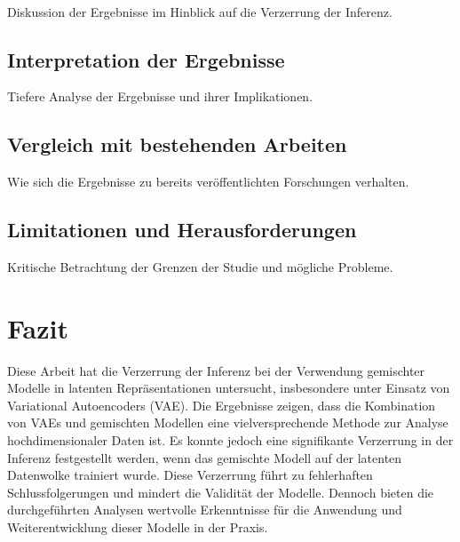 \documentclass[%
thesis=student,%
coverpage=false,%
titlepage=false,%
headmarks=true, %
german,%
font=libertine, %
math=newpxtx, %
BCOR=5mm,%
coverBCOR=11mm%
]{tumbook}
\theoremstyle{break}
\begin{document}
\\
Diskussion der Ergebnisse im Hinblick auf die Verzerrung der Inferenz.

\section{Interpretation der Ergebnisse}
Tiefere Analyse der Ergebnisse und ihrer Implikationen.
\section{Vergleich mit bestehenden Arbeiten}
Wie sich die Ergebnisse zu bereits veröffentlichten Forschungen verhalten.
\section{Limitationen und Herausforderungen}
Kritische Betrachtung der Grenzen der Studie und mögliche Probleme.
\chapter{Fazit}
Diese Arbeit hat die Verzerrung der Inferenz bei der Verwendung gemischter Modelle in latenten Repräsentationen untersucht, insbesondere unter Einsatz von Variational Autoencoders (VAE). Die Ergebnisse zeigen, dass die Kombination von VAEs und gemischten Modellen eine vielversprechende Methode zur Analyse hochdimensionaler Daten ist. Es konnte jedoch eine signifikante Verzerrung in der Inferenz festgestellt werden, wenn das gemischte Modell auf der latenten Datenwolke trainiert wurde. Diese Verzerrung führt zu fehlerhaften Schlussfolgerungen und mindert die Validität der Modelle. Dennoch bieten die durchgeführten Analysen wertvolle Erkenntnisse für die Anwendung und Weiterentwicklung dieser Modelle in der Praxis.
\end{document}
